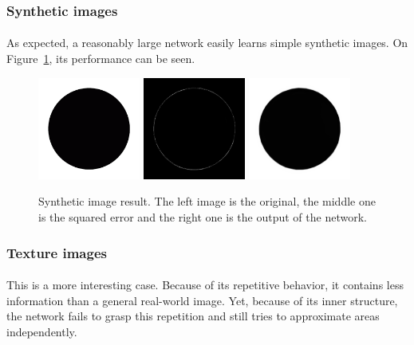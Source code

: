 \documentclass[a4paper]{article}
\begin{document}
\subsubsection{Synthetic images}

\paragraph{}As expected, a reasonably large network easily learns simple synthetic images. On Figure~\ref{fig:circ2}, its performance can be seen.

\begin{figure}[h]
\centering
\includegraphics[width=0.3\textwidth]{circ2.png}
\includegraphics[width=0.3\textwidth]{circ2e.png}
\includegraphics[width=0.3\textwidth]{circ2o.png}
\caption{\label{fig:circ2}Synthetic image result. The left image is the original, the middle one is the squared error and the right one is the output of the network.}
\end{figure}

\subsubsection{Texture images}

\paragraph{}This is a more interesting case. Because of its repetitive behavior, it contains less information than a general real-world image. Yet, because of its inner structure, the network fails to grasp this repetition and still tries to approximate areas independently. 
\end{document}
